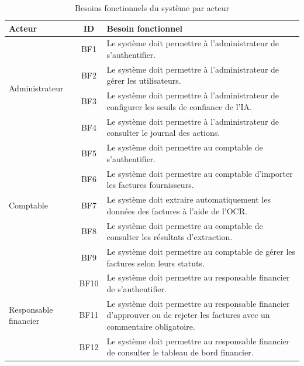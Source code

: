\begin{table}[H]
	\centering
	\renewcommand{\arraystretch}{1.4}
	
	\begin{tabularx}{\textwidth}{|p{3cm}|c|X|}
		\hline
		\rowcolor{blue!20}
		\textbf{Acteur} & \textbf{ID} & \textbf{Besoin fonctionnel} \\ \hline
		
		\multirow{4}{3cm}{Administrateur}
		& BF1 & Le système doit permettre à l’administrateur de s’authentifier. \\ \cline{2-3}
		& BF2 & Le système doit permettre à l’administrateur de gérer les utilisateurs. \\ \cline{2-3}
		& BF3 & Le système doit permettre à l’administrateur de configurer les seuils de confiance de l’IA. \\ \cline{2-3}
		& BF4 & Le système doit permettre à l’administrateur de consulter le journal des actions. \\ \hline
		
		\multirow{5}{3cm}{Comptable}
		& BF5 & Le système doit permettre au comptable de s’authentifier. \\ \cline{2-3}
		& BF6 & Le système doit permettre au comptable d’importer les factures fournisseurs. \\ \cline{2-3}
		& BF7 & Le système doit extraire automatiquement les données des factures à l’aide de l’OCR. \\ \cline{2-3}
		& BF8 & Le système doit permettre au comptable de consulter les résultats d’extraction. \\ \cline{2-3}
		& BF9 & Le système doit permettre au comptable de gérer les factures selon leurs statuts. \\ \hline
		
		\multirow{3}{3cm}{Responsable financier}
		& BF10 & Le système doit permettre au responsable financier de s’authentifier. \\ \cline{2-3}
		& BF11 & Le système doit permettre au responsable financier d’approuver ou de rejeter les factures avec un commentaire obligatoire. \\ \cline{2-3}
		& BF12 & Le système doit permettre au responsable financier de consulter le tableau de bord financier. \\ \hline
		
	\end{tabularx}
	
	\caption{Besoins fonctionnels du système par acteur}
	\label{tab:besoins_fonctionnels}
\end{table}

